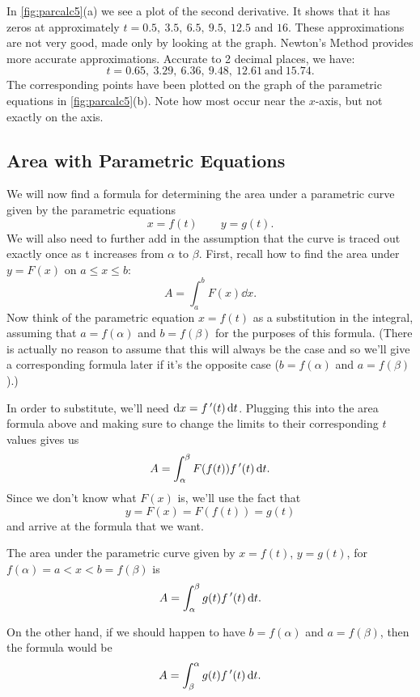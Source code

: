 \begin{example}
In \autoref{fig:parcalc5}(a) we see a plot of the second derivative. It shows that it has zeros at approximately $t=0.5,\ 3.5,\ 6.5,\ 9.5,\ 12.5$ and $16$. These approximations are not very good, made only by looking at the graph. Newton's Method provides more accurate approximations. Accurate to 2 decimal places, we have:
\[t=0.65,\ 3.29,\ 6.36,\ 9.48,\ 12.61\ \text{and}\ 15.74.\]
The corresponding points have been plotted on the graph of the parametric equations in \autoref{fig:parcalc5}(b). Note how most occur near the $x$-axis, but not exactly on the axis.
\end{example}


\subsection{Area with Parametric Equations}

We will now find a formula for determining the area under a parametric curve given by the parametric equations
\[x=f(t)\qquad y=g(t).\]
We will also need to further add in the assumption that the curve is traced out exactly once as t increases from $\alpha$ to $\beta$.
%
First, recall how to find the area under $y=F(x)$ on $a\le x\le b$:
\[A=\int_a^b F(x)\dd x.\]
Now think of the parametric equation $x=f(t)$ as a substitution in the integral, assuming that $a=f(\alpha)$ and $b=f(\beta)$ for the purposes of this formula.  (There is actually no reason to assume that this will always be the case and so we'll give a corresponding formula later if it's the opposite case ($b=f(\alpha)$ and $a=f(\beta)$).)

In order to substitute, we'll need $\operatorname{d}\! x=f\,'(t)\operatorname{d}\! t$. Plugging this into the area formula above and making sure to change the limits to their corresponding $t$ values gives us
\[A=\int_\alpha^\beta F(f(t))f\,'(t)\operatorname{d}\! t.\]
Since we don't know what $F(x)$ is, we'll use the fact that
\[y=F(x)=F(f(t))=g(t)\]
and arrive at the formula that we want.

\begin{keyidea}\label{ki_param_area}%
The area under the parametric curve given by $x=f(t)$, $y=g(t)$, for $f(\alpha)=a<x<b=f(\beta)$ is
\[A=\int_\alpha^\beta g(t)f\,'(t)\operatorname{d}\! t.\]
\end{keyidea}

On the other hand, if we should happen to have $b=f(\alpha)$ and $a=f(\beta)$, then the formula would be
\[A=\int_\beta^\alpha g(t)f\,'(t)\operatorname{d}\! t.\]

